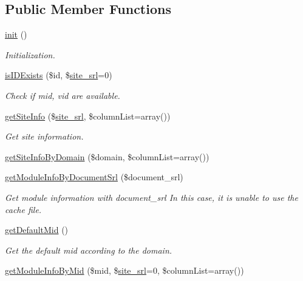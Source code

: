 \subsection*{Public Member Functions}
\begin{DoxyCompactItemize}
\item 
\hyperlink{classmoduleModel_a1d6fb4cdd3dd5e068e71cacc551f517c}{init} ()
\begin{DoxyCompactList}\small\item\em Initialization. \end{DoxyCompactList}\item 
\hyperlink{classmoduleModel_a5f53ae1101876e8967cc3c40e54badcd}{is\-I\-D\-Exists} (\$id, \$\hyperlink{ko_8install_8php_a8b1406b4ad1048041558dce6bfe89004}{site\-\_\-srl}=0)
\begin{DoxyCompactList}\small\item\em Check if mid, vid are available. \end{DoxyCompactList}\item 
\hyperlink{classmoduleModel_a96446e3b8e031ec1264c7187cb1384a5}{get\-Site\-Info} (\$\hyperlink{ko_8install_8php_a8b1406b4ad1048041558dce6bfe89004}{site\-\_\-srl}, \$column\-List=array())
\begin{DoxyCompactList}\small\item\em Get site information. \end{DoxyCompactList}\item 
\hyperlink{classmoduleModel_a6c4e1496c55c3c15507bb9532cb01c7f}{get\-Site\-Info\-By\-Domain} (\$domain, \$column\-List=array())
\item 
\hyperlink{classmoduleModel_a6b3ba81393e32a934f7bff65f05663d5}{get\-Module\-Info\-By\-Document\-Srl} (\$document\-\_\-srl)
\begin{DoxyCompactList}\small\item\em Get module information with document\-\_\-srl In this case, it is unable to use the cache file. \end{DoxyCompactList}\item 
\hyperlink{classmoduleModel_ae76b5be74783d11b676b167ba2c63523}{get\-Default\-Mid} ()
\begin{DoxyCompactList}\small\item\em Get the default mid according to the domain. \end{DoxyCompactList}\item 
\hyperlink{classmoduleModel_a543ca661568188ef493ff138246de29c}{get\-Module\-Info\-By\-Mid} (\$mid, \$\hyperlink{ko_8install_8php_a8b1406b4ad1048041558dce6bfe89004}{site\-\_\-srl}=0, \$column\-List=array())

\end{DoxyCompactItemize}
